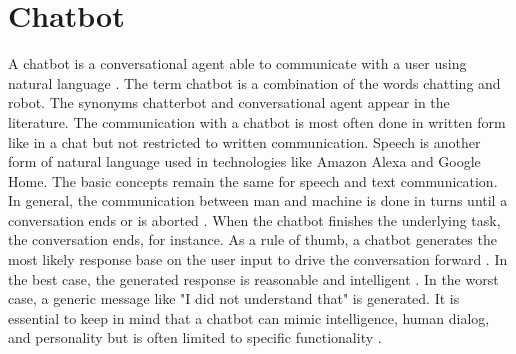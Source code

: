 \section{Chatbot} \label{sec:chatbot}
A chatbot is a conversational agent able to communicate with a user using natural language 
\cite{evaluateChatbotsShawar2007, shawar2007chatbots, huang2007extracting, gregori2017evaluation}.
The term chatbot is a combination of the words chatting and robot.
The synonyms chatterbot and conversational agent appear in the literature.
The communication with a chatbot is most often done in written form like in a chat but not restricted to written communication. 
Speech is another form of natural language used in technologies like Amazon Alexa and Google Home.
The basic concepts remain the same for speech and text communication. 
In general, the communication between man and machine is done in turns until a conversation ends or is aborted \cite{vrajitoru2004evolutionary}.
When the chatbot finishes the underlying task, the conversation ends, for instance.
As a rule of thumb, a chatbot generates the most likely response base on the user input to drive the conversation forward \cite{dutta2017developing}.
In the best case, the generated response is reasonable and intelligent \cite{vrajitoru2004evolutionary}. 
In the worst case, a generic message like "I did not understand that" is generated.
It is essential to keep in mind that a chatbot can mimic intelligence, human dialog, and personality but is often limited to specific functionality \cite{kane2016role, dutta2017developing}.

